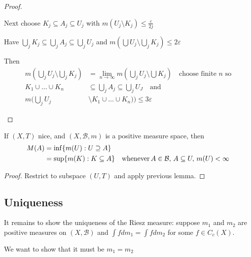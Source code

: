 \begin{proof}
\begin{enumerate}
	Next choose $K_j \subseteq A_j \subseteq U_j$ with  $m(U_j \setminus K_j) \leq \frac{\varepsilon}{2j}$ 

	Have $\bigcup_j K_j \subseteq \bigcup_j A_j \subseteq \bigcup_j U_j$ and  $m(\bigcup U_j \setminus \bigcup_j K_j ) \leq 2 \varepsilon$ 

	Then 
	\begin{align*}
		m( \bigcup_{j} U_j \setminus \bigcup_j K_j) &= \lim_{n \to \infty} m ( \bigcup_j U_j \setminus \bigcup K_j) \quad \text{choose finite $n$ so} \\
		K_1 \cup \ldots \cup K_n &\subseteq \bigcup_j A_j \subseteq \bigcup_j U_J \quad \text{and} \\
		m(\bigcup_j U_j &\setminus K_1 \cup \ldots \cup K_n )) \leq 3\varepsilon
	\end{align*} 
\end{enumerate}

\end{proof}

\begin{lemma}
	If $(X, T)$ nice, and $(X,\mathcal{B}, m)$ is a positive measure space, then
	\begin{align*}
		M(A) &= \inf\{m(U) : U \supseteq A\} \\
			 &= \sup \{m(K) : K \subseteq A \} \quad \text{whenever} \, A \in \mathcal{B},
			 \, A \subseteq U, \, m(U) < \infty
	\end{align*}
\end{lemma}

\begin{proof}
	Restrict to subspace $(U,T)$ and apply previous lemma.
\end{proof}

\subsection{Uniqueness}
It remains to show the uniqueness of the Riesz measure: suppose $m_1$ and $m_2$ are positive measures on $(X,\mathcal{B})$ and $\int f dm_1 = \int f dm_2$ for some  $f \in C_c(X)$.


We want to show that it must be  $m_1 = m_2$

